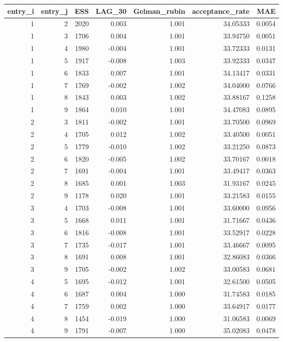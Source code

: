 \begin{longtable}{rrrrrrr}
\toprule
entry\_i & entry\_j & ESS & LAG\_30 & Gelman\_rubin & acceptance\_rate & MAE \\ 
\midrule
1 & 2 & 2020 & 0.003 & 1.001 & 34.05333 & 0.0054 \\ 
1 & 3 & 1706 & 0.004 & 1.001 & 33.94750 & 0.0051 \\ 
1 & 4 & 1980 & -0.004 & 1.001 & 33.72333 & 0.0131 \\ 
1 & 5 & 1917 & -0.008 & 1.003 & 33.92333 & 0.0347 \\ 
1 & 6 & 1833 & 0.007 & 1.001 & 34.13417 & 0.0331 \\ 
1 & 7 & 1769 & -0.002 & 1.002 & 34.04000 & 0.0766 \\ 
1 & 8 & 1843 & 0.003 & 1.002 & 33.88167 & 0.1258 \\ 
1 & 9 & 1864 & 0.010 & 1.001 & 34.47083 & 0.0895 \\ 
2 & 3 & 1811 & -0.002 & 1.001 & 33.70500 & 0.0969 \\ 
2 & 4 & 1705 & 0.012 & 1.002 & 33.40500 & 0.0051 \\ 
2 & 5 & 1779 & -0.010 & 1.002 & 33.21250 & 0.0873 \\ 
2 & 6 & 1820 & -0.005 & 1.002 & 33.70167 & 0.0018 \\ 
2 & 7 & 1691 & -0.004 & 1.001 & 33.49417 & 0.0363 \\ 
2 & 8 & 1685 & 0.001 & 1.003 & 31.93167 & 0.0245 \\ 
2 & 9 & 1178 & 0.020 & 1.001 & 33.21583 & 0.0155 \\ 
3 & 4 & 1703 & -0.008 & 1.001 & 33.60000 & 0.0956 \\ 
3 & 5 & 1668 & 0.011 & 1.001 & 31.71667 & 0.0436 \\ 
3 & 6 & 1816 & -0.008 & 1.001 & 33.52917 & 0.0228 \\ 
3 & 7 & 1735 & -0.017 & 1.001 & 33.46667 & 0.0095 \\ 
3 & 8 & 1691 & 0.008 & 1.001 & 32.86083 & 0.0366 \\ 
3 & 9 & 1705 & -0.002 & 1.002 & 33.00583 & 0.0681 \\ 
4 & 5 & 1695 & -0.012 & 1.001 & 32.61500 & 0.0505 \\ 
4 & 6 & 1687 & 0.004 & 1.000 & 31.74583 & 0.0185 \\ 
4 & 7 & 1759 & 0.002 & 1.000 & 33.64917 & 0.0177 \\ 
4 & 8 & 1454 & -0.019 & 1.000 & 31.06583 & 0.0069 \\ 
4 & 9 & 1791 & -0.007 & 1.000 & 35.02083 & 0.0478 \\ 

\end{longtable}
